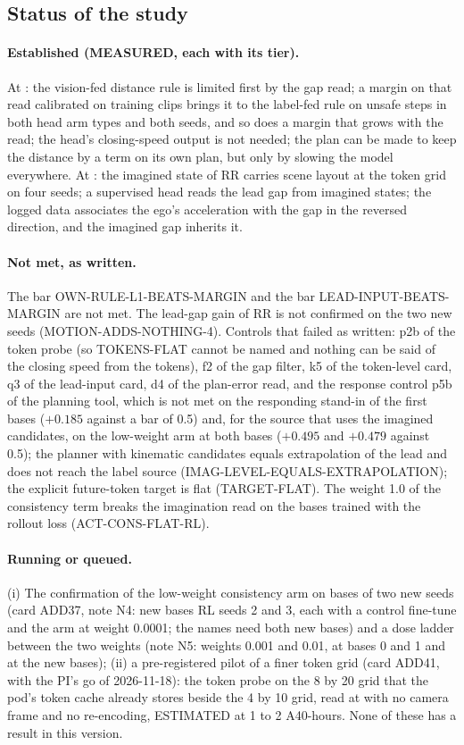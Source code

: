 \subsection{Status of the study}\label{sec:status}
\paragraph{Established (MEASURED, each with its tier).} At : the vision-fed distance rule is limited first by the gap read; a margin on that read calibrated on training clips brings it to the label-fed rule on unsafe steps in both head arm types and both seeds, and so does a margin that grows with the read; the head's closing-speed output is not needed; the plan can be made to keep the distance by a term on its own plan, but only by slowing the model everywhere. At : the imagined state of RR carries scene layout at the token grid on four seeds; a supervised head reads the lead gap from imagined states; the logged data associates the ego's acceleration with the gap in the reversed direction, and the imagined gap inherits it.

\paragraph{Not met, as written.} The bar OWN-RULE-L1-BEATS-MARGIN and the bar LEAD-INPUT-BEATS-MARGIN are not met. The lead-gap gain of RR is not confirmed on the two new seeds (MOTION-ADDS-NOTHING-4). Controls that failed as written: p2b of the token probe (so TOKENS-FLAT cannot be named and nothing can be said of the closing speed from the tokens), f2 of the gap filter, k5 of the token-level card, q3 of the lead-input card, d4 of the plan-error read, and the response control p5b of the planning tool, which is not met on the responding stand-in of the first bases ($+0.185$ against a bar of 0.5) and, for the source that uses the imagined candidates, on the low-weight arm at both bases ($+0.495$ and $+0.479$ against 0.5); the planner with kinematic candidates equals extrapolation of the lead and does not reach the label source (IMAG-LEVEL-EQUALS-EXTRAPOLATION); the explicit future-token target is flat (TARGET-FLAT). The weight 1.0 of the consistency term breaks the imagination read on the bases trained with the rollout loss (ACT-CONS-FLAT-RL).

\paragraph{Running or queued.} (i) The confirmation of the low-weight consistency arm on bases of two new seeds (card ADD37, note N4: new bases RL seeds 2 and 3, each with a control fine-tune and the arm at weight 0.0001; the names need both new bases) and a dose ladder between the two weights (note N5: weights 0.001 and 0.01, at bases 0 and 1 and at the new bases); (ii) a pre-registered pilot of a finer token grid (card ADD41, with the PI's go of 2026-11-18): the token probe on the 8 by 20 grid that the pod's token cache already stores beside the 4 by 10 grid, read at  with no camera frame and no re-encoding, ESTIMATED at 1 to 2 A40-hours. None of these has a result in this version.

